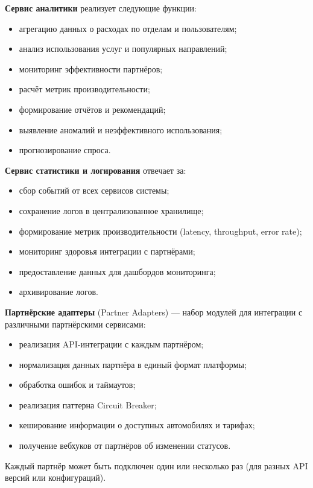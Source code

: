 \documentclass{bmstu}
\begin{document}
\textbf{Сервис аналитики} реализует следующие функции:
\begin{itemize}
    \item агрегацию данных о расходах по отделам и пользователям;
    \item анализ использования услуг и популярных направлений;
    \item мониторинг эффективности партнёров;
    \item расчёт метрик производительности;
    \item формирование отчётов и рекомендаций;
    \item выявление аномалий и неэффективного использования;
    \item прогнозирование спроса.
\end{itemize}

\textbf{Сервис статистики и логирования} отвечает за:
\begin{itemize}
    \item сбор событий от всех сервисов системы;
    \item сохранение логов в централизованное хранилище;
    \item формирование метрик производительности (latency, throughput, error rate);
    \item мониторинг здоровья интеграции с партнёрами;
    \item предоставление данных для дашбордов мониторинга;
    \item архивирование логов.
\end{itemize}

\textbf{Партнёрские адаптеры} (Partner Adapters) — набор модулей для интеграции с различными партнёрскими сервисами:
\begin{itemize}
    \item реализация API-интеграции с каждым партнёром;
    \item нормализация данных партнёра в единый формат платформы;
    \item обработка ошибок и таймаутов;
    \item реализация паттерна Circuit Breaker;
    \item кеширование информации о доступных автомобилях и тарифах;
    \item получение вебхуков от партнёров об изменении статусов.
\end{itemize}

Каждый партнёр может быть подключен один или несколько раз (для разных API версий или конфигураций).
\end{document}
